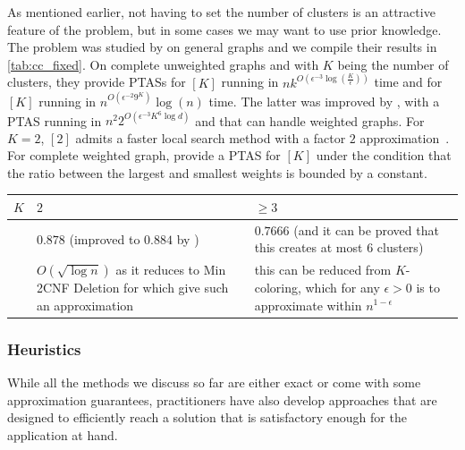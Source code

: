 \begin{aside}
As mentioned earlier, not having to set the number of clusters is an
attractive feature of the \pcc{} problem, but in some cases we may want to use prior knowledge.  The
problem was studied by \textcite{Giotis2006} on general graphs and we compile their results in
\autoref{tab:cc_fixed}. On complete unweighted graphs and with $K$ being the number of clusters, they
provide PTASs for \maxa{}$[K]$ running in $nk^{O(\epsilon^{-3}\log(\frac{K}{\epsilon}))}$ time and for
\mind{}$[K]$ running in $n^{O\left(\epsilon^{-2} 9^K\right)}\log(n)$ time. The latter was improved by
\textcite{LinearMinPTAS09}, with a PTAS running in $n^2 2^{O\left(\epsilon^{-3}K^6\log d\right)}$
and that can handle weighted graphs. For $K=2$, \mind$[2]$ admits a faster local search method with a
factor $2$ approximation~\autocite{Coleman2008}.
For complete weighted graph, \textcite{WeightedMaxAPTAS08} provide a PTAS for
\maxa{}$[K]$ under the condition that the ratio between the largest and smallest weights is bounded by a
constant.
\begin{center}
   \captionsetup{font=small}
   \begin{tabulary}{150mm}{lLL}
      \toprule
      $K$	 & $2$ & $\geq 3$ \\
      \midrule
      \maxa{} & $0.878$ (improved to $0.884$ by \autocite{Mitra2009}) & $0.7666$
      \autocite{Swamy2004} (and it can be proved that this creates at most $6$ clusters) \\
      \mind{} & $O(\sqrt{\log n})$ as it reduces to Min 2CNF Deletion for which \textcite{min2CNF05}
      give such an approximation &
      this can be reduced from $K$-coloring, which for any $\epsilon > 0$ is \NPc{} to approximate
      within $n^{1-\epsilon}$ \autocite{InnaproxChroma07} \\
      \bottomrule
   \end{tabulary}
\end{center}
\end{aside}


\subsubsection{Heuristics}
\label{ssub:cc_heuristics}

While all the methods we discuss so far
are either exact or come with some approximation guarantees, practitioners have also develop
approaches that are designed to efficiently reach a solution that is satisfactory enough for the
application at hand.

